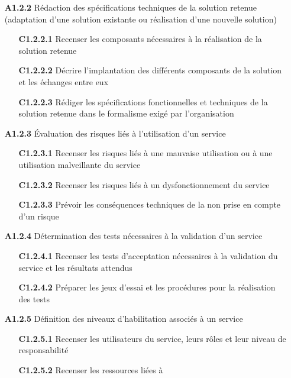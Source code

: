 \documentclass[12pt,a4paper,oneside,titlepage,final]{article}
\begin{document}
\begin{enumerate}
\begin{itemize}
  \end{itemize}
  \item [\textbf{A1.2.2}] Rédaction des spécifications techniques de
  la solution retenue (adaptation d'une solution existante ou
  réalisation d'une nouvelle solution)
  \begin{itemize}
    \item [\textbf{C1.2.2.1}] Recenser les composants
    nécessaires à la réalisation de la solution retenue
    \item [\textbf{C1.2.2.2}] Décrire l'implantation des différents
    composants de la solution et les échanges entre eux
    \item [\textbf{C1.2.2.3}] Rédiger les spécifications
    fonctionnelles et techniques de la solution retenue dans le
    formalisme exigé par l'organisation
  \end{itemize}
  \item [\textbf{A1.2.3}] Évaluation des risques liés à l'utilisation
  d'un service
  \begin{itemize}
    \item [\textbf{C1.2.3.1}] Recenser les risques liés à une
    mauvaise utilisation ou à une utilisation malveillante du service
    \item [\textbf{C1.2.3.2}] Recenser les risques liés à un
    dysfonctionnement du service
    \item [\textbf{C1.2.3.3}] Prévoir les conséquences techniques de
    la non prise en compte d'un risque
  \end{itemize}
  \item [\textbf{A1.2.4}] Détermination des tests nécessaires à la
  validation d'un service
  \begin{itemize}
    \item [\textbf{C1.2.4.1}] Recenser les tests d'acceptation
    nécessaires à la validation du service et les résultats attendus
    \item [\textbf{C1.2.4.2}] Préparer les jeux d'essai et les
    procédures pour la réalisation des tests
  \end{itemize}
  \item [\textbf{A1.2.5}] Définition des niveaux d'habilitation
  associés à un service
  \begin{itemize}
    \item [\textbf{C1.2.5.1}] Recenser les utilisateurs du
    service, leurs rôles et leur niveau de responsabilité
    \item [\textbf{C1.2.5.2}] Recenser les ressources liées à

\end{itemize}
\end{enumerate}
\end{document}
